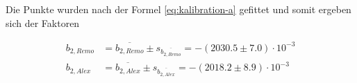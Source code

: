 Die Punkte wurden nach  der  Formel  \ref{eq:kalibration-a} gefittet und somit
ergeben sich der Faktoren

\begin{align*}
    b_{2,Remo} &= \overline{b_{2,Remo}} \pm s_{\overline{b_{2,Remo}}} = -(2030.5 \pm 7.0)\cdot 10^{-3} \\
    b_{2,Alex} &= \overline{b_{2,Alex}} \pm s_{\overline{b_{2,Alex}}} = -(2018.2 \pm 8.9)\cdot 10^{-3}
\end{align*}

